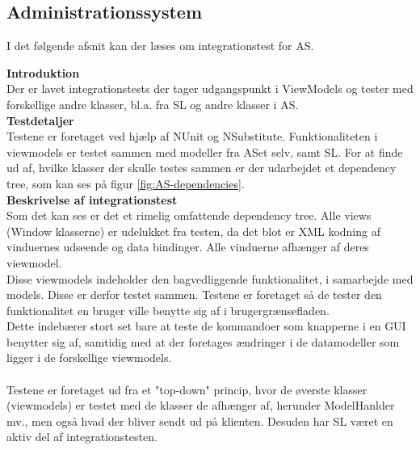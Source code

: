 \subsection{Administrationssystem}
I det følgende afsnit kan der læses om integrationstest for \gls{AS}.

\textbf{Introduktion}\\
Der er lavet integrationstests der tager udgangspunkt i ViewModels og tester med forskellige andre klasser, bl.a. fra \gls{SL} og andre klasser i \gls{AS}.\\

\textbf{Testdetaljer}\\
Testene er foretaget ved hjælp af NUnit og NSubstitute. Funktionaliteten i viewmodels er testet sammen med modeller fra \gls{AS}et selv, samt \gls{SL}. For at finde ud af, hvilke klasser der skulle testes sammen er der udarbejdet et dependency tree, som kan ses på figur \ref{fig:AS-dependencies}.\\


\textbf{Beskrivelse af integrationstest}\\
Som det kan ses er det et rimelig omfattende dependency tree. Alle views (Window klasserne) er udelukket fra testen, da det blot er XML kodning af vinduernes udseende og data bindinger. Alle vinduerne afhænger af deres viewmodel.\\
Disse viewmodels indeholder den bagvedliggende funktionalitet, i samarbejde med models. Disse er derfor testet sammen. Testene er foretaget så de tester den funktionalitet en bruger ville benytte sig af i brugergrænsefladen.\\
Dette indebærer stort set bare at teste de kommandoer som knapperne i en GUI benytter sig af, samtidig med at der foretages ændringer i de datamodeller som ligger i de forskellige viewmodels.\\
\\
 Testene er foretaget ud fra et "top-down" princip, hvor de øverste klasser (viewmodels) er testet med de klasser de afhænger af, herunder ModelHanlder mv., men også hvad der bliver sendt ud på klienten. Desuden har \gls{SL} været en aktiv del af integrationstesten.

